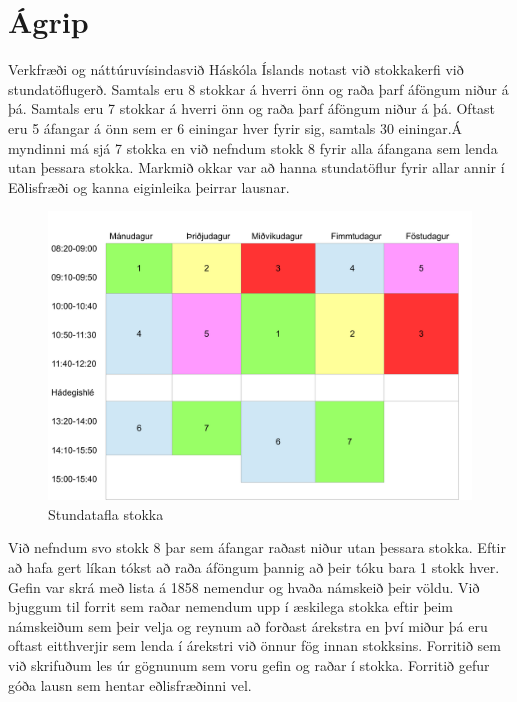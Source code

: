 \documentclass[a4paper,12pt]{article}
\begin{document}
\section{Ágrip}
Verkfræði og náttúruvísindasvið Háskóla Íslands notast við stokkakerfi við stundatöflugerð. Samtals eru 8 stokkar á hverri önn og raða þarf áföngum niður á þá. Samtals eru 7 stokkar á hverri önn og raða þarf áföngum niður á þá. Oftast eru 5 áfangar á önn sem er 6 einingar hver fyrir sig, samtals 30 einingar.Á myndinni má sjá 7 stokka en við nefndum stokk 8 fyrir alla áfangana sem lenda utan þessara stokka. Markmið okkar var að hanna stundatöflur fyrir allar annir í Eðlisfræði og kanna eiginleika þeirrar lausnar.
\begin{figure}[ht!]
\centering
\includegraphics[scale=0.3]{stundatafla}
\caption{Stundatafla stokka}
\label{fig: stundatafla}
\end{figure}

Við nefndum svo stokk 8 þar sem áfangar raðast niður utan þessara stokka. Eftir að hafa gert líkan tókst að raða áföngum þannig að þeir tóku bara 1 stokk hver. Gefin var skrá með lista á 1858 nemendur og hvaða námskeið þeir völdu. Við bjuggum til forrit sem raðar nemendum upp í æskilega stokka eftir þeim námskeiðum sem þeir velja og reynum að forðast árekstra en því miður þá eru oftast eitthverjir sem lenda í árekstri við önnur fög innan stokksins. Forritið sem við skrifuðum les úr gögnunum sem voru gefin og raðar í stokka. Forritið gefur góða lausn sem hentar eðlisfræðinni vel.
\end{document}
